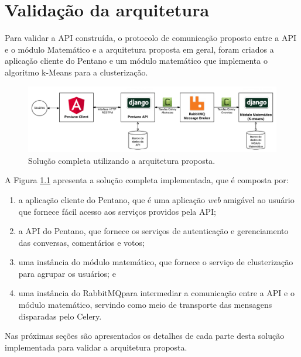 \chapter{Validação da arquitetura} \label{cap:aplicacao_exemplo}

  Para validar a API construída, o protocolo de comunicação proposto entre a API e o módulo Matemático
  e a arquitetura proposta em geral, foram criados a aplicação cliente do Pentano e um módulo matemático
  que implementa o algoritmo k-Means para a clusterização.
  
  \begin{figure}[h!]
    \centering
    \includegraphics[scale=0.3]{figuras/whole_solution.png}
    \caption{Solução completa utilizando a arquitetura proposta.}
    \label{fig:whole_solution}
  \end{figure}
  
  A Figura \ref{fig:whole_solution} apresenta a solução completa implementada, que
  é composta por:
  
  \begin{enumerate}
      \item a aplicação cliente do Pentano, que é uma aplicação \textit{web} amigável ao usuário que fornece 
      fácil acesso aos serviços providos pela API;
      \item a API do Pentano, que fornece os serviços de autenticação e gerenciamento das conversas, comentários e votos; 
      \item uma instância do módulo matemático,
	  que fornece o serviço de clusterização para agrupar os usuários; e
      \item uma instância do RabbitMQ\footnotemark para
	  intermediar a comunicação entre a API e o módulo matemático, servindo como meio de transporte das
	  mensagens disparadas pelo Celery.
  \end{enumerate}

  Nas próximas seções são apresentados os detalhes de cada parte desta solução implementada
  para validar a arquitetura proposta.
  
  
